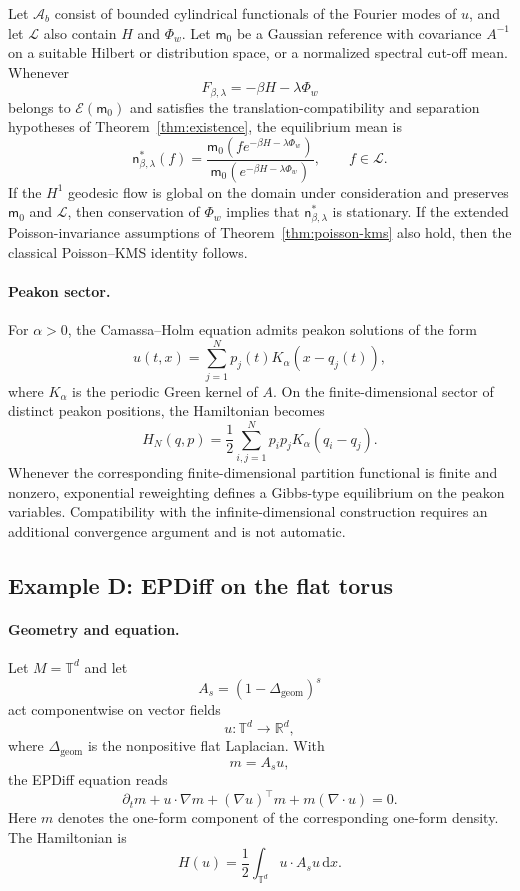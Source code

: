 \documentclass[11pt,reqno]{amsart}
\begin{document}
Let $\mathcal A_b$ consist of bounded cylindrical functionals of the
Fourier modes of $u$, and let $\mathcal L$ also contain $H$ and
$\Phi_w$. Let $\mathsf m_0$ be a Gaussian reference with covariance
$A^{-1}$ on a suitable Hilbert or distribution space, or a normalized
spectral cut-off mean. Whenever
\[
F_{\beta,\lambda}
=
-\beta H-\lambda\Phi_w
\]
belongs to $\mathcal E(\mathsf m_0)$ and satisfies the
translation-compatibility and separation hypotheses of
Theorem~\ref{thm:existence}, the equilibrium mean is
\[
\boxed{
\mathsf n_{\beta,\lambda}^*(f)
=
\frac{
\mathsf m_0
\left(
f e^{-\beta H-\lambda\Phi_w}
\right)
}{
\mathsf m_0
\left(
e^{-\beta H-\lambda\Phi_w}
\right)
},
\qquad
f\in\mathcal L.
}
\]
If the $H^1$ geodesic flow is global on the domain under consideration
and preserves $\mathsf m_0$ and $\mathcal L$, then conservation of
$\Phi_w$ implies that $\mathsf n_{\beta,\lambda}^*$ is stationary. If
the extended Poisson-invariance assumptions of
Theorem~\ref{thm:poisson-kms} also hold, then the classical
Poisson--KMS identity follows.

\paragraph{\bfseries Peakon sector.}
For $\alpha>0$, the Camassa--Holm equation admits peakon solutions of
the form
\[
u(t,x)
=
\sum_{j=1}^{N}
p_j(t)K_\alpha(x-q_j(t)),
\]
where $K_\alpha$ is the periodic Green kernel of $A$. On the
finite-dimensional sector of distinct peakon positions, the Hamiltonian
becomes
\[
H_N(q,p)
=
\frac12
\sum_{i,j=1}^{N}
p_ip_jK_\alpha(q_i-q_j).
\]
Whenever the corresponding finite-dimensional partition functional is
finite and nonzero, exponential reweighting defines a Gibbs-type
equilibrium on the peakon variables. Compatibility with the
infinite-dimensional construction requires an additional convergence
argument and is not automatic.

\subsection{Example D: EPDiff on the flat torus}

\paragraph{\bfseries Geometry and equation.}
Let $M=\mathbb T^d$ and let
\[
A_s=(1-\Delta_{\mathrm{geom}})^s
\]
act componentwise on vector fields
\[
u\colon\mathbb T^d\longrightarrow\mathbb R^d,
\]
where $\Delta_{\mathrm{geom}}$ is the nonpositive flat Laplacian. With
\[
m=A_su,
\]
the EPDiff equation reads
\[
\partial_t m
+
u\cdot\nabla m
+
(\nabla u)^\top m
+
m(\nabla\cdot u)
=
0.
\]
Here $m$ denotes the one-form component of the corresponding one-form
density. The Hamiltonian is
\[
H(u)
=
\frac12
\int_{\mathbb T^d}
u\cdot A_su\,\mathrm dx.
\]
\end{document}
